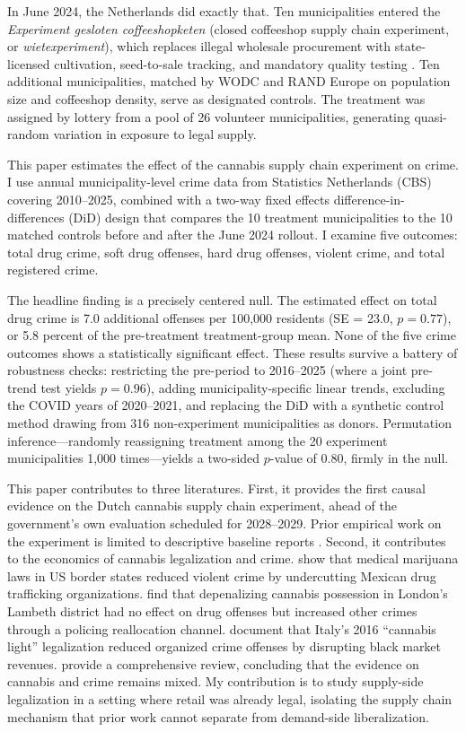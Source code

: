 \documentclass[12pt]{article}
\begin{document}
In June 2024, the Netherlands did exactly that. Ten municipalities entered the \textit{Experiment gesloten coffeeshopketen} (closed coffeeshop supply chain experiment, or \textit{wietexperiment}), which replaces illegal wholesale procurement with state-licensed cultivation, seed-to-sale tracking, and mandatory quality testing \citep{vanlaar2022cannabis}. Ten additional municipalities, matched by WODC and RAND Europe on population size and coffeeshop density, serve as designated controls. The treatment was assigned by lottery from a pool of 26 volunteer municipalities, generating quasi-random variation in exposure to legal supply.

This paper estimates the effect of the cannabis supply chain experiment on crime. I use annual municipality-level crime data from Statistics Netherlands (CBS) covering 2010--2025, combined with a two-way fixed effects difference-in-differences (DiD) design that compares the 10 treatment municipalities to the 10 matched controls before and after the June 2024 rollout. I examine five outcomes: total drug crime, soft drug offenses, hard drug offenses, violent crime, and total registered crime.

The headline finding is a precisely centered null. The estimated effect on total drug crime is 7.0 additional offenses per 100,000 residents (SE = 23.0, $p = 0.77$), or 5.8 percent of the pre-treatment treatment-group mean. None of the five crime outcomes shows a statistically significant effect. These results survive a battery of robustness checks: restricting the pre-period to 2016--2025 (where a joint pre-trend test yields $p = 0.96$), adding municipality-specific linear trends, excluding the COVID years of 2020--2021, and replacing the DiD with a synthetic control method drawing from 316 non-experiment municipalities as donors. Permutation inference---randomly reassigning treatment among the 20 experiment municipalities 1,000 times---yields a two-sided $p$-value of 0.80, firmly in the null.

This paper contributes to three literatures. First, it provides the first causal evidence on the Dutch cannabis supply chain experiment, ahead of the government's own evaluation scheduled for 2028--2029. Prior empirical work on the experiment is limited to descriptive baseline reports \citep{rand2024baseline}. Second, it contributes to the economics of cannabis legalization and crime. \citet{gavrilova2019legal} show that medical marijuana laws in US border states reduced violent crime by undercutting Mexican drug trafficking organizations. \citet{adda2014crime} find that depenalizing cannabis possession in London's Lambeth district had no effect on drug offenses but increased other crimes through a policing reallocation channel. \citet{dragone2019crime} document that Italy's 2016 ``cannabis light'' legalization reduced organized crime offenses by disrupting black market revenues. \citet{anderson2023public} provide a comprehensive review, concluding that the evidence on cannabis and crime remains mixed. My contribution is to study supply-side legalization in a setting where retail was already legal, isolating the supply chain mechanism that prior work cannot separate from demand-side liberalization.
\end{document}
